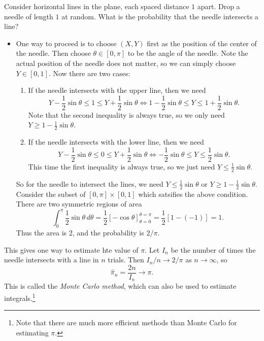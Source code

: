 \begin{example}
  Consider horizontal lines in the plane, each
  spaced distance $1$ apart. Drop a needle of
  length $1$ at random. What is the probability that
  the needle intersects a line?
  \begin{itemize}
    \item One way to proceed is to choose
      $(X, Y)$ first as the position of the center
      of the needle. Then choose $\theta \in [0, \pi]$
      to be the angle of the needle. Note the
      actual position of the needle does not matter,
      so we can simply choose $Y \in [0, 1]$. Now
      there are two cases:
      \begin{enumerate}
        \item If the needle intersects with the upper
          line, then we need
          \[
            Y - \frac{1}{2} \sin \theta \le 1 \le Y + \frac{1}{2} \sin \theta \iff 1 - \frac{1}{2} \sin \theta \le Y \le 1 + \frac{1}{2} \sin \theta.
          \]
          Note that the second inequality is always
          true, so we only need $Y \ge 1 - \frac{1}{2} \sin \theta$.
        \item If the needle intersects with the lower
          line, then we need
          \[
            Y - \frac{1}{2} \sin \theta \le 0 \le Y + \frac{1}{2} \sin \theta \iff -\frac{1}{2} \sin \theta \le Y \le \frac{1}{2} \sin \theta.
        \]
        This time the first inequality is always
        true, so we just need $Y \le \frac{1}{2} \sin \theta$.
      \end{enumerate}
      So for the needle to intersect the
      lines, we need $Y \le \frac{1}{2} \sin \theta$
      or $Y \ge 1 - \frac{1}{2} \sin \theta$.
      Consider the subset of $[0, \pi] \times [0, 1]$
      which satsifies the above condition. There
      are two symmetric regions of area
      \[
        \int_0^\pi \frac{1}{2} \sin \theta\, d\theta
        = \frac{1}{2} [-\cos \theta]_{\theta = 0}^{\theta = \pi}
        = \frac{1}{2} [1 - (-1)] = 1.
      \]
      Thus the area is $2$, and the probability is
      $2 / \pi$.
  \end{itemize}
  This gives one way to estimate hte value of $\pi$.
  Let $I_n$ be the number of times the needle
  intersects with a line in $n$ trials. Then
  $I_n / n \to 2 / \pi$ as $n \to \infty$, so
  \[
    \widehat{\pi}_n = \frac{2n}{I_n} \to \pi.
  \]
  This is called the \emph{Monte Carlo method},
  which can also be used to estimate integrals.\footnote{Note that there are much more efficient methods than Monte Carlo for estimating $\pi$.}
\end{example}

